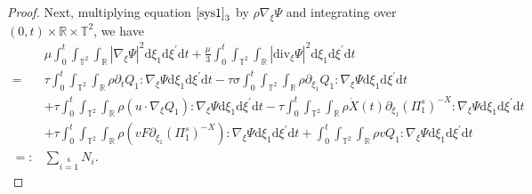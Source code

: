 \documentclass[10pt,reqno]{amsart}
\numberwithin{equation}{section}
\newcommand{\dif}{\mathrm{d}}
\newcommand{\ddiv}{\mathrm{div}}
\begin{document}
\begin{proof}
Next, multiplying equation $\eqref{sys1}_3$ by $\rho\nabla_\xi\Psi$ and integrating over $(0, t)\times\mathbb{R}\times\mathbb{T}^2$, we have
\begin{align*}
&\mu\int_0^t\int_{\mathbb{T}^2}\int_{\mathbb{R}}|\nabla_\xi\Psi|^2\dif \xi_1\dif \xi^{\prime}\dif t
+\frac{\mu}{3}\int_0^t\int_{\mathbb{T}^2}\int_{\mathbb{R}}
   |\ddiv_\xi\Psi|^2
\dif \xi_1\dif \xi^{\prime}\dif t\\
=&\tau\int_0^t\int_{\mathbb{T}^2}\int_{\mathbb{R}}\rho
\partial_tQ_1
:\nabla_\xi\Psi\dif \xi_1\dif \xi^{\prime}\dif t
-\tau\sigma\int_0^t\int_{\mathbb{T}^2}\int_{\mathbb{R}}\rho
\partial_{\xi_1}Q_1
:\nabla_\xi\Psi\dif \xi_1\dif \xi^{\prime}\dif t\\
&+\tau\int_0^t\int_{\mathbb{T}^2}\int_{\mathbb{R}}\rho
        ( u\cdot\nabla_\xi Q_1)
:\nabla_\xi\Psi\dif \xi_1\dif \xi^{\prime}\dif t
-\tau\int_0^t\int_{\mathbb{T}^2}\int_{\mathbb{R}}\rho
     \dot{X}(t)\partial_{\xi_1}(\Pi_1^s)^{-X}
:\nabla_\xi\Psi\dif \xi_1\dif \xi^{\prime}\dif t\\
&+\tau\int_0^t\int_{\mathbb{T}^2}\int_{\mathbb{R}}\rho
        (vF\partial_{\xi_1}(\Pi_1^s)^{-X})
:\nabla_\xi\Psi\dif \xi_1\dif \xi^{\prime}\dif t
+\int_0^t\int_{\mathbb{T}^2}\int_{\mathbb{R}}\rho
    v  Q_1
:\nabla_\xi\Psi\dif \xi_1\dif \xi^{\prime}\dif t\\
=:&\sum\limits_{i=1}\limits^6N_i.
\end{align*}

\end{proof}
\end{document}
